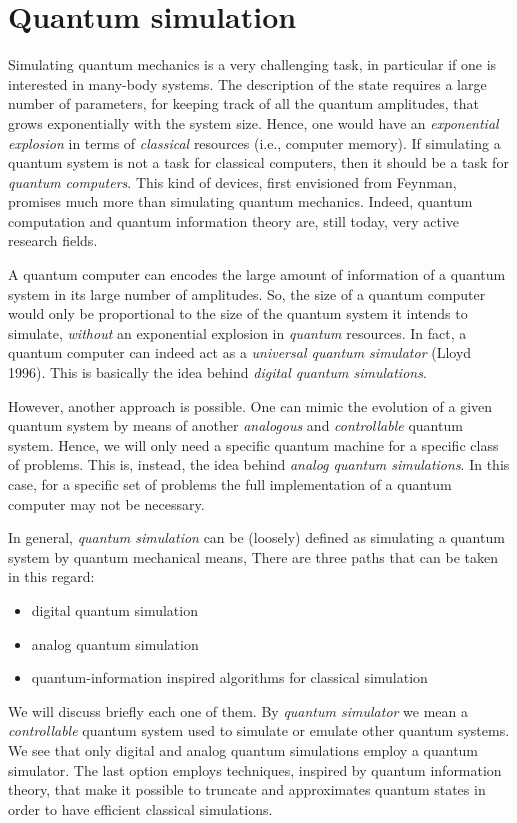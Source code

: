 \section{Quantum simulation}
\label{sec:quantum_simulation}

Simulating quantum mechanics is a very challenging task, in particular if one is interested in many-body systems.
The description of the state requires a large number of parameters, for keeping track of all the quantum amplitudes, that grows exponentially with the system size.
Hence, one would have an \emph{exponential explosion} in terms of \emph{classical} resources (i.e., computer memory).
If simulating a quantum system is not a task for classical computers, then it should be a task for \emph{quantum computers}.
This kind of devices, first envisioned from Feynman\citneeded, promises much more than simulating quantum mechanics.
Indeed, quantum computation and quantum information theory are, still today, very active research fields.

A quantum computer can encodes the large amount of information of a quantum system in its large number of amplitudes.
So, the size of a quantum computer would only be proportional to the size of the quantum system it intends to simulate, \emph{without} an exponential explosion in \emph{quantum} resources.
In fact, a quantum computer can indeed act as a \emph{universal quantum simulator} (Lloyd 1996\citneeded).
This is basically the idea behind \emph{digital quantum simulations}.

However, another approach is possible.
One can mimic the evolution of a given quantum system by means of another \emph{analogous} and \emph{controllable} quantum system.
Hence, we will only need a specific quantum machine for a specific class of problems.
This is, instead, the idea behind \emph{analog quantum simulations}.
In this case, for a specific set of problems the full implementation of a quantum computer may not be necessary.

In general, \emph{quantum simulation} can be (loosely) defined as simulating a quantum system by quantum mechanical means,
There are three paths that can be taken in this regard:
\begin{itemize}
    \item digital quantum simulation
    \item analog quantum simulation
    \item quantum-information inspired algorithms for classical simulation
\end{itemize}
We will discuss briefly each one of them.
By \emph{quantum simulator} we mean a \emph{controllable} quantum system used to simulate or emulate other quantum systems.
We see that only digital and analog quantum simulations employ a quantum simulator.
The last option employs techniques, inspired by quantum information theory, that make it possible to truncate and approximates quantum states in order to have efficient classical simulations.


